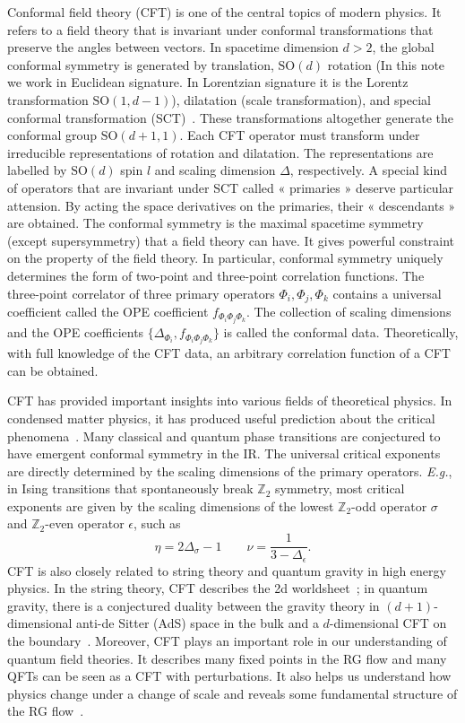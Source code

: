 \documentclass{timesjhep}
\begin{document}
Conformal field theory (CFT) is one of the central topics of modern physics. It refers to a field theory that is invariant under conformal transformations that preserve the angles between vectors. In spacetime dimension $d>2$, the global conformal symmetry is generated by translation, $\mathrm{SO}(d)$ rotation (In this note we work in Euclidean signature. In Lorentzian signature it is the Lorentz transformation $\mathrm{SO}(1,d-1)$), dilatation (scale transformation), and special conformal transformation (SCT)~\cite{Rychkov2016CFT,SimmonsDuffin2016CFT}. These transformations altogether generate the conformal group $\mathrm{SO}(d+1,1)$. Each CFT operator must transform under irreducible representations of rotation and dilatation. The representations are labelled by $\mathrm{SO}(d)$ spin $l$ and scaling dimension $\Delta$, respectively. A special kind of operators that are invariant under SCT called « primaries » deserve particular attension. By acting the space derivatives on the primaries, their « descendants » are obtained. The conformal symmetry is the maximal spacetime symmetry (except supersymmetry) that a field theory can have. It gives powerful constraint on the property of the field theory. In particular, conformal symmetry uniquely determines the form of two-point and three-point correlation functions. The three-point correlator of three primary operators $\Phi_i,\Phi_j,\Phi_k$ contains a universal coefficient called the OPE coefficient $f_{\Phi_i\Phi_j\Phi_k}$. The collection of scaling dimensions and the OPE coefficients $\{\Delta_{\Phi_i},f_{\Phi_i\Phi_j\Phi_k}\}$ is called the conformal data. Theoretically, with full knowledge of the CFT data, an arbitrary correlation function of a CFT can be obtained. 

CFT has provided important insights into various fields of theoretical physics. In condensed matter physics, it has produced useful prediction about the critical phenomena~\cite{Polyakov1970Conformal,Cardy1996Scaling}. Many classical and quantum phase transitions are conjectured to have emergent conformal symmetry in the IR. The universal critical exponents are directly determined by the scaling dimensions of the primary operators. \textit{E.g.}, in Ising transitions that spontaneously break $\mathbb{Z}_2$ symmetry, most critical exponents are given by the scaling dimensions of the lowest $\mathbb{Z}_2$-odd operator $\sigma$ and $\mathbb{Z}_2$-even operator $\epsilon$, such as 
\begin{equation}
    \eta=2\Delta_\sigma-1\qquad\nu=\frac{1}{3-\Delta_\epsilon}.
\end{equation} 
CFT is also closely related to string theory and quantum gravity in high energy physics. In the string theory, CFT describes the 2d worldsheet~; in quantum gravity, there is a conjectured duality between the gravity theory in $(d+1)$-dimensional anti-de Sitter (AdS) space in the bulk and a $d$-dimensional CFT on the boundary~\cite{Maldacena1998AdSCFT}. Moreover, CFT plays an important role in our understanding of quantum field theories. It describes many fixed points in the RG flow and many QFTs can be seen as a CFT with perturbations. It also helps us understand how physics change under a change of scale and reveals some fundamental structure of the RG flow~\cite{Zamolodchikov1986Irreversibility}. 
\end{document}

